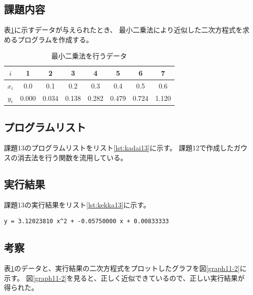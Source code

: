 \documentclass[a4j,titlepage]{jsarticle}
\begin{document}
\subsection{課題内容}
表\ref{tb:kadai13}に示すデータが与えられたとき、
最小二乗法により近似した二次方程式を求めるプログラムを作成する。

\begin{table}[H]
  \centering
  \caption{最小二乗法を行うデータ}
  \label{tb:kadai13}

  \begin{tabular}{|c|c|c|c|c|c|c|c|}
    \hline
    $i$ & 1 & 2 & 3 & 4 & 5 & 6 & 7 \\ \hline
    $x_i$ & 0.0 & 0.1 & 0.2 & 0.3 & 0.4 & 0.5 & 0.6 \\ \hline
    $y_i$ & 0.000 & 0.034 & 0.138 & 0.282 & 0.479 & 0.724 & 1.120 \\ \hline
  \end{tabular}
\end{table}

\subsection{プログラムリスト}
課題13のプログラムリストをリスト\ref{lst:kadai13}に示す。
課題12で作成したガウスの消去法を行う関数を流用している。



\subsection{実行結果}
課題13の実行結果をリスト\ref{lst:kekka13}に示す。

\begin{lstlisting}[style=text,caption=課題13の実行結果,label=lst:kekka13]
y = 3.12023810 x^2 + -0.05750000 x + 0.00833333
\end{lstlisting}

\subsection{考察}
表\ref{tb:kadai13}のデータと、実行結果の二次方程式をプロットしたグラフを図\ref{graph11-2}に示す。
図\ref{graph11-2}を見ると、正しく近似できているので、正しい実行結果が得られた。
\end{document}
